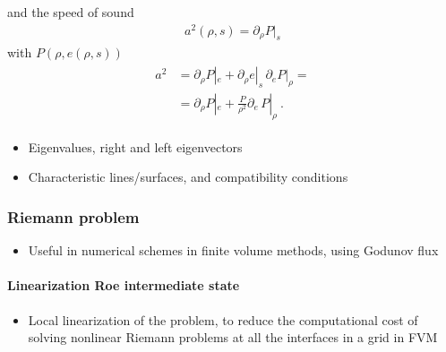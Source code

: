 \documentclass[letterpaper,10pt,english]{jupyterBook}
\begin{document}
\sphinxAtStartPar
and the speed of sound
\begin{equation*}
\begin{split}a^2(\rho,s) = \partial_\rho P|_s\end{split}
\end{equation*}
\sphinxAtStartPar
with \(P(\rho, e(\rho,s))\)
\begin{equation*}
\begin{split}\begin{aligned}
  a^2 
  & = \partial_\rho P|_e + \partial_\rho e|_s \, \partial_e P|_\rho  = \\
  & = \partial_\rho P|_e + \frac{P}{\rho^2}\partial_e \, P|_\rho  \ .
\end{aligned}\end{split}
\end{equation*}\begin{itemize}
\item {} 
\sphinxAtStartPar
Eigenvalues, right and left eigenvectors

\item {} 
\sphinxAtStartPar
Characteristic lines/surfaces, and compatibility conditions

\end{itemize}


\subsubsection{Riemann problem}
\label{\detokenize{ch/pde/hyperbolic-nd-euler:riemann-problem}}\label{\detokenize{ch/pde/hyperbolic-nd-euler:pde-hyperbolic-nd-euler-riemann}}\begin{itemize}
\item {} 
\sphinxAtStartPar
Useful in numerical schemes in finite volume methods, using Godunov flux

\end{itemize}


\paragraph{Linearization \sphinxhyphen{} Roe intermediate state}
\label{\detokenize{ch/pde/hyperbolic-nd-euler:linearization-roe-intermediate-state}}\label{\detokenize{ch/pde/hyperbolic-nd-euler:pde-hyperbolic-nd-euler-riemann-roe}}\begin{itemize}
\item {} 
\sphinxAtStartPar
Local linearization of the problem, to reduce the computational cost of solving non\sphinxhyphen{}linear Riemann problems at all the interfaces in a grid in FVM

\end{itemize}
\end{document}
